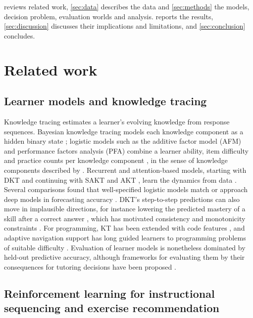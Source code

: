 \documentclass[a4paper,preprint,12pt,authoryear]{elsarticle}
\begin{document}
 reviews related work, \cref{sec:data} describes the data and \cref{sec:methods} the models, decision problem, evaluation worlds and analysis.  reports the results, \cref{sec:discussion} discusses their implications and limitations, and \cref{sec:conclusion} concludes.

\section{Related work}\label{sec:related}

\subsection{Learner models and knowledge tracing}

Knowledge tracing estimates a learner's evolving knowledge from response sequences. Bayesian knowledge tracing models each knowledge component as a hidden binary state \citep{corbett1994bkt}; logistic models such as the additive factor model (AFM) and performance factors analysis (PFA) combine a learner ability, item difficulty and practice counts per knowledge component \citep{cen2006lfa,pavlik2009pfa,pelanek2017learner}, in the sense of knowledge components described by \citet{koedinger2012kli}. Recurrent and attention-based models, starting with DKT \citep{piech2015dkt} and continuing with SAKT and AKT \citep{pandey2019sakt,ghosh2020akt}, learn the dynamics from data \citep[see][for a survey]{abdelrahman2023survey}. Several comparisons found that well-specified logistic models match or approach deep models in forecasting accuracy \citep{khajah2016deep,wilson2016basics,gervet2020deep}. DKT's step-to-step predictions can also move in implausible directions, for instance lowering the predicted mastery of a skill after a correct answer \citep{yeung2018dktplus}, which has motivated consistency and monotonicity constraints \citep{zhang2023cmkt}. For programming, KT has been extended with code features \citep{shi2022codedkt}, and adaptive navigation support has long guided learners to programming problems of suitable difficulty \citep{hsiao2010guiding,brusilovsky2007user}. Evaluation of learner models is nonetheless dominated by held-out predictive accuracy, although frameworks for evaluating them by their consequences for tutoring decisions have been proposed \citep{gonzalezbrenes2015leopard,huang2015multifaceted}.

\subsection{Reinforcement learning for instructional sequencing and exercise recommendation}
\end{document}
